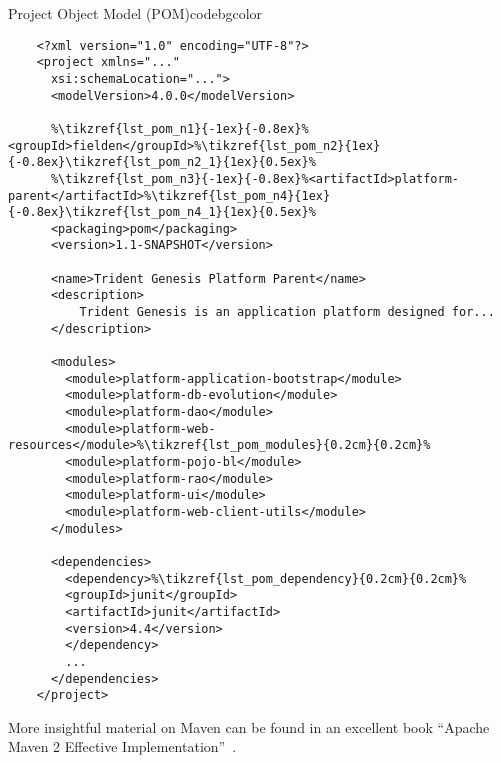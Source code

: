   \begin{code}{Project Object Model (POM)}{\label{lst:pom}}{codebgcolor}
    \begin{lstlisting}
    <?xml version="1.0" encoding="UTF-8"?>
    <project xmlns="..."
	  xsi:schemaLocation="...">
	  <modelVersion>4.0.0</modelVersion>

	  %\tikzref{lst_pom_n1}{-1ex}{-0.8ex}%<groupId>fielden</groupId>%\tikzref{lst_pom_n2}{1ex}{-0.8ex}\tikzref{lst_pom_n2_1}{1ex}{0.5ex}%
	  %\tikzref{lst_pom_n3}{-1ex}{-0.8ex}%<artifactId>platform-parent</artifactId>%\tikzref{lst_pom_n4}{1ex}{-0.8ex}\tikzref{lst_pom_n4_1}{1ex}{0.5ex}%
	  <packaging>pom</packaging>
	  <version>1.1-SNAPSHOT</version>

	  <name>Trident Genesis Platform Parent</name>
	  <description>
	      Trident Genesis is an application platform designed for...
	  </description>

	  <modules>
		<module>platform-application-bootstrap</module>
		<module>platform-db-evolution</module>
		<module>platform-dao</module>
		<module>platform-web-resources</module>%\tikzref{lst_pom_modules}{0.2cm}{0.2cm}%
		<module>platform-pojo-bl</module>
		<module>platform-rao</module>
		<module>platform-ui</module>
		<module>platform-web-client-utils</module>
	  </modules>

	  <dependencies>
	    <dependency>%\tikzref{lst_pom_dependency}{0.2cm}{0.2cm}%
		<groupId>junit</groupId>
		<artifactId>junit</artifactId>
		<version>4.4</version>
	    </dependency>
	    ...
	  </dependencies>
    </project> 
    \end{lstlisting}


  
    \vspace*{-40pt}
  \end{code}

  More insightful material on Maven can be found in an excellent book ``Apache Maven 2 Effective Implementation''~\cite{PoCh2009}.
